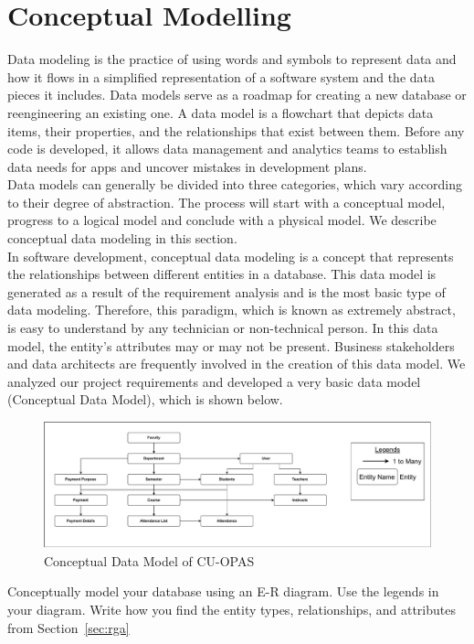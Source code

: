 \section{Conceptual Modelling}\label{sec:cm}

Data modeling is the practice of using words and symbols to represent data and how it flows in a simplified representation of a software system and the data pieces it includes. Data models serve as a roadmap for creating a new database or reengineering an existing one. A data model is a flowchart that depicts data items, their properties, and the relationships that exist between them. Before any code is developed, it allows data management and analytics teams to establish data needs for apps and uncover mistakes in development plans.\\
Data models can generally be divided into three categories, which vary according to their degree of abstraction. The process will start with a conceptual model, progress to a logical model and conclude with a physical model. We describe conceptual data modeling in this section.\\

In software development, conceptual data modeling is a concept that represents the relationships between different entities in a database. This data model is generated as a result of the requirement analysis and is the most basic type of data modeling. Therefore, this paradigm, which is known as extremely abstract, is easy to understand by any technician or non-technical person. In this data model, the entity's attributes may or may not be present. Business stakeholders and data architects are frequently involved in the creation of this data model. 
We analyzed our project requirements and developed a very basic data model (Conceptual Data Model), which is shown below.

\begin{figure}[H]
    \centering
    \includegraphics[width=1\textwidth]{images/conceptual}
    \caption{Conceptual Data Model of CU-OPAS}
    \label{fig:conceptual}
\end{figure}

Conceptually model your database using an E-R diagram. Use the legends in your diagram. Write how you find the entity types, relationships, and attributes from Section~\ref{sec:rga}